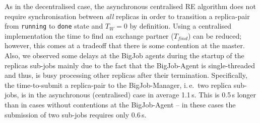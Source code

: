 \documentclass{rspublic}
\newcommand{\jhanote}[1]{ {\textcolor{red} { ***shantenu: #1 }}}
\newcommand{\alnote}[1]{ {\textcolor{blue} { ***andre: #1 }}}
\newcommand{\athotanote}[1]{ {\textcolor{green} { ***athota: #1 }}}
\newcommand{\alnote}[1]{}
\newcommand{\athotanote}[1]{}
\newcommand{\jhanote}[1]{}
\begin{document}

As in the decentralised case, the asynchronous centralised RE
algorithm does not require synchronisation between {\it all} replicas
in order to transition a replica-pair from \texttt{run\-ning} to
\texttt{done} state and $T_W = 0$ by definition. Using a centralised
implementation the time to find an exchange partner ($T_{find}$) can be
reduced; however, this comes at a tradeoff that there is some
contention at the master. Also, we observed some delays at the BigJob
agents during the startup of the replicas sub-jobs mainly due to the
fact that the BigJob-Agent is single-threaded and thus, is busy
processing other replicas after their termination.  Specifically, the
time-to-submit a replica-pair to the BigJob-Manager, 
i.\,e.\ two replica sub-jobs, is in the asynchronous (centralised) case 
in average 1.1\,s. This is 0.5\,s longer than in cases
without contentions at the BigJob-Agent -- in these cases the submission
of two sub-jobs requires only 0.6\,s.
\end{document}

